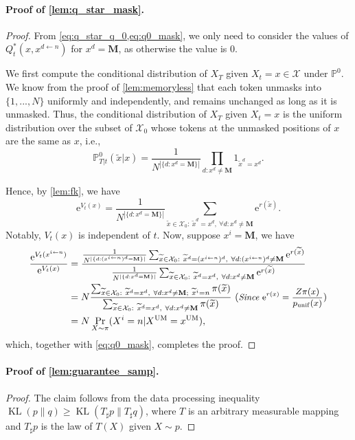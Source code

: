 \documentclass{article}
\theoremstyle{remark}
\newcommand{\e}{\mathrm{e}}
\renewcommand{\P}{\mathbb{P}}
\newcommand{\kl}{\operatorname{KL}}
\newcommand{\cX}{\mathcal{X}}
\newcommand{\xt}{\widetilde{x}}
\newcommand{\punif}{p_\mathrm{unif}}
\newcommand{\um}{\mathrm{UM}} %
\newcommand{\mask}{\mathbf{M}}
\begin{document}
\paragraph{Proof of \cref{lem:q_star_mask}.}
\begin{proof}
From \cref{eq:q_star_q_0,eq:q0_mask}, we only need to consider the values of $Q^*_t(x,x^{d\gets n})$ for $x^d=\mask$, as otherwise the value is $0$.

We first compute the conditional distribution of $X_T$ given $X_t=x\in\cX$ under $\P^0$. We know from the proof of \cref{lem:memoryless} that each token unmasks into $\{1,...,N\}$ uniformly and independently, and remains unchanged as long as it is unmasked. Thus, the conditional distribution of $X_T$ given $X_t=x$ is the uniform distribution over the subset of $\cX_0$ whose tokens at the unmasked positions of $x$ are the same as $x$, i.e.,
$$\P^0_{T|t}(\xt|x)=\frac{1}{N^{|\{d:x^d=\mask\}|}}\prod_{d:x^d\ne\mask}1_{\xt^d=x^d}.$$

Hence, by \cref{lem:fk}, we have
$$\e^{V_t(x)}=\frac{1}{N^{|\{d:x^d=\mask\}|}}\sum_{\xt\in\cX_0:~\xt^d=x^d,~\forall d:x^d\ne\mask}\e^{r(\xt)}.$$
Notably, $V_t(x)$ is independent of $t$. Now, suppose $x^i=\mask$, we have
\begin{align*}
    \frac{\e^{V_t(x^{i\gets n})}}{\e^{V_t(x)}}&=\frac{\frac{1}{N^{|\{d:(x^{i\gets n})^d=\mask\}|}}\sum_{\xt\in\cX_0:~\xt^d=(x^{i\gets n})^d,~\forall d:(x^{i\gets n})^d\ne\mask}\e^{r(\xt)}}{\frac{1}{N^{|\{d:x^d=\mask\}|}}\sum_{\xt\in\cX_0:~\xt^d=x^d,~\forall d:x^d\ne\mask}\e^{r(\xt)}}\\
    &=N\frac{\sum_{\xt\in\cX_0:~\xt^d=x^d,~\forall d:x^d\ne\mask;~\xt^i=n}\pi(\xt)}{\sum_{\xt\in\cX_0:~\xt^d=x^d,~\forall d:x^d\ne\mask}\pi(\xt)}~(\textit{\small Since $\e^{r(x)}=\frac{Z\pi(x)}{\punif(x)}$})\\
    &=N\Pr_{X\sim\pi}(X^i=n|X^\um=x^\um),
\end{align*}
which, together with \cref{eq:q0_mask}, completes the proof.
\end{proof}



\paragraph{Proof of \cref{lem:guarantee_samp}.}
\begin{proof}
The claim follows from the data processing inequality $\kl(p\|q)\ge\kl(T_\sharp p\|T_\sharp q)$, where $T$ is an arbitrary measurable mapping and $T_\sharp p$ is the law of $T(X)$ given $X\sim p$. 
\end{proof}
\end{document}
